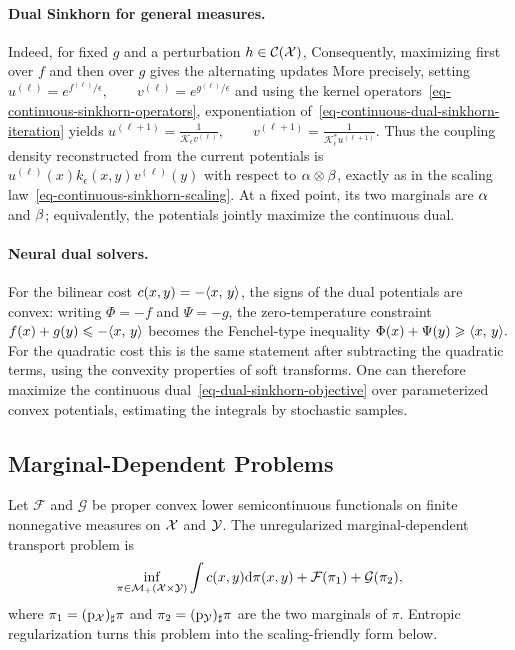 \paragraph{Dual Sinkhorn for general measures.}\label{par-continuous-dual-sinkhorn}
Indeed, for fixed $g$ and a perturbation $h\in\mathcal{C}(\mathcal{X})$,
Consequently, maximizing first over $f$ and then over $g$ gives the alternating updates
More precisely, setting
\(u^{(\ell)}=e^{f^{(\ell)}/\epsilon}, \qquad v^{(\ell)}=e^{g^{(\ell)}/\epsilon}\)
and using the kernel operators~\eqref{eq-continuous-sinkhorn-operators}, exponentiation of~\eqref{eq-continuous-dual-sinkhorn-iteration} yields
\(u^{(\ell+1)}=\frac{1}{\mathcal K_\epsilon v^{(\ell)}}, \qquad v^{(\ell+1)}=\frac{1}{\mathcal K_\epsilon^*u^{(\ell+1)}}.\)
Thus the coupling density reconstructed from the current potentials is
\(
u^{(\ell)}(x)k_\epsilon(x,y)v^{(\ell)}(y)
\)
with respect to $\alpha\otimes\beta$, exactly as in the scaling law~\eqref{eq-continuous-sinkhorn-scaling}. At a fixed point, its two marginals are $\alpha$ and $\beta$; equivalently, the potentials jointly maximize the continuous dual.

\paragraph{Neural dual solvers.}
For the bilinear cost \(c(x,y)=-\langle x,\,y\rangle\), the signs of the dual potentials are convex: writing \(\Phi=-f\) and \(\Psi=-g\), the zero-temperature constraint \(f(x)+g(y)\leqslant-\langle x,\,y\rangle\) becomes the Fenchel-type inequality
\(\Phi(x)+\Psi(y)\geqslant \langle x,\,y\rangle.\)
For the quadratic cost this is the same statement after subtracting the quadratic terms, using the convexity properties of soft transforms. One can therefore maximize the continuous dual~\eqref{eq-dual-sinkhorn-objective} over parameterized convex potentials, estimating the integrals by stochastic samples.

\subsection{Marginal-Dependent Problems}
\label{sec-sinkhorn-marginal-dependent}
Let $\mathcal F$ and $\mathcal G$ be proper convex lower semicontinuous functionals on finite nonnegative measures on $\mathcal{X}$ and $\mathcal{Y}$. The unregularized marginal-dependent transport problem is
\begin{equation}\label{eq-marginal-dependent-unregularized-cont}
\inf_{\pi\in\mathcal{M}_+(\mathcal{X}\times\mathcal{Y})}
\int c(x,y)\mathrm{d}\pi(x,y)
+
\mathcal F(\pi_1)
+
\mathcal G(\pi_2),
\end{equation}
where $\pi_1=(\mathrm{p}_{\mathcal{X}})_\sharp\pi$ and $\pi_2=(\mathrm{p}_{\mathcal{Y}})_\sharp\pi$ are the two marginals of $\pi$. Entropic regularization turns this problem into the scaling-friendly form below.

